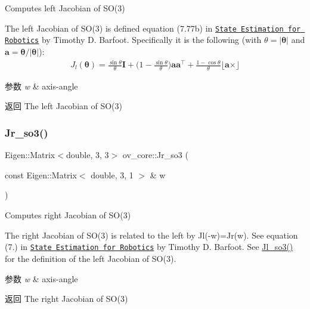 Computes left Jacobian of S\+O(3) 

The left Jacobian of S\+O(3) is defined equation (7.\+77b) in \href{http://asrl.utias.utoronto.ca/~tdb/bib/barfoot_ser17.pdf}{\tt State Estimation for Robotics} by Timothy D. Barfoot. Specifically it is the following (with $\theta=|\boldsymbol\theta|$ and $\mathbf a=\boldsymbol\theta/|\boldsymbol\theta|$)\+: \begin{align*} J_l(\boldsymbol\theta) = \frac{\sin\theta}{\theta}\mathbf I + \Big(1-\frac{\sin\theta}{\theta}\Big)\mathbf a \mathbf a^\top + \frac{1-\cos\theta}{\theta}\lfloor \mathbf a \times\rfloor \end{align*}


\begin{DoxyParams}{参数}
{\em w} & axis-\/angle \\
\hline
\end{DoxyParams}
\begin{DoxyReturn}{返回}
The left Jacobian of S\+O(3) 
\end{DoxyReturn}
\mbox{\label{namespaceov__core_a0406d085d6175d3bc8a539328ec214b5}} 
\subsubsection{\texorpdfstring{Jr\+\_\+so3()}{Jr\_so3()}}
{\footnotesize\ttfamily Eigen\+::\+Matrix$<$double, 3, 3$>$ ov\+\_\+core\+::\+Jr\+\_\+so3 (\begin{DoxyParamCaption}\item[{const Eigen\+::\+Matrix$<$ double, 3, 1 $>$ \&}]{w }\end{DoxyParamCaption})\hspace{0.3cm}{\ttfamily [inline]}}



Computes right Jacobian of S\+O(3) 

The right Jacobian of S\+O(3) is related to the left by Jl(-\/w)=Jr(w). See equation (7.) in \href{http://asrl.utias.utoronto.ca/~tdb/bib/barfoot_ser17.pdf}{\tt State Estimation for Robotics} by Timothy D. Barfoot. See \hyperlink{namespaceov__core_a518b7324a4106ccad60558e2e5c4b14f}{Jl\+\_\+so3()} for the definition of the left Jacobian of S\+O(3).


\begin{DoxyParams}{参数}
{\em w} & axis-\/angle \\
\hline
\end{DoxyParams}
\begin{DoxyReturn}{返回}
The right Jacobian of S\+O(3) 
\end{DoxyReturn}
\mbox{\label{namespaceov__core_aaf3626f4ed6392b8b0b0d0a75ff08a61}} 
